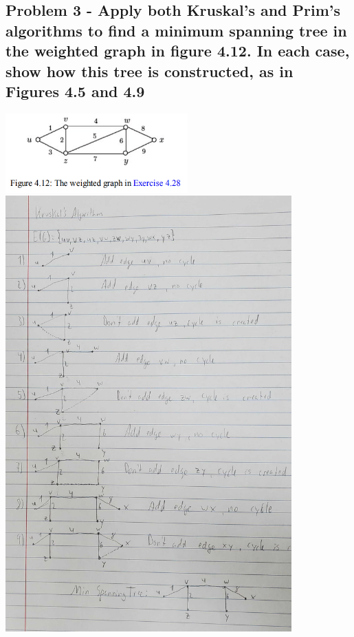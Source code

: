 \documentclass[10pt,a4paper]{article}
\begin{document}
\subsection*{\newpage Problem 3 - Apply both Kruskal's and Prim's algorithms to find a minimum spanning tree in the weighted graph in figure 4.12. In each case, show how this tree is constructed, as in Figures 4.5 and 4.9}
\includegraphics[width = 7cm]{fig412}\\
\includegraphics[width = 11cm]{kruskals}\\
\end{document}
